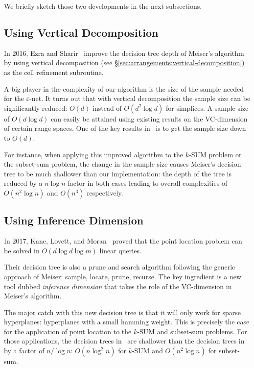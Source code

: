 We briefly sketch those two developments in the next subsections.

\subsection{Using Vertical Decomposition}%
\label{sec:developments:ksum-algorithm:ES17}

In 2016, Ezra and Sharir~\cite{ES17} improve the decision tree depth of
Meiser's algorithm by using vertical decomposition (see \S\ref{sec:arrangements:vertical-decomposition}) as the cell refinement
subroutine.

A big player in the complexity of our algorithm is the size of the sample
needed for the \(\varepsilon\)-net. It turns out that with
vertical decomposition the sample size can be significantly reduced: $O(d)$
instead of $O(d^2 \log d)$ for simplices.
%
A sample size of $O(d \log d)$ can easily be attained using existing results on
the VC-dimension of certain range spaces. One of the key results in~\cite{ES17}
is to get the sample size down to $O(d)$.

For instance,
when applying this improved algorithm to the \(k\)-SUM problem or the
subset-sum problem,
the change in the sample size causes Meiser's decision tree to be
much shallower than our implementation:
the depth of the tree is reduced by a \(n \log n\) factor in both cases leading
to overall complexities of \(O(n^2 \log n)\) and \(O(n^3)\) respectively.

\subsection{Using Inference Dimension}%
\label{sec:developments:ksum-algorithm:KLM18}

In 2017, Kane, Lovett, and Moran~\cite{KLM18} proved that the point location
problem can be solved in \(O(d \log d \log m)\) linear queries.

Their decision tree is also a prune and search algorithm following
the generic approach of Meiser: sample, locate,
prune, recurse. The key ingredient is a new tool dubbed \emph{inference
dimension} that takes the role of the VC-dimension in Meiser's algorithm.

The major catch with this new decision tree is that it will only work for
sparse hyperplanes: hyperplanes with a small hamming weight. This is precisely
the case for the application of point location to the \(k\)-SUM and subset-sum
problems. For those applications, the decision trees in~\cite{KLM18} are shallower than the
decision trees in~\cite{ES17} by a factor of $n / \log n$:
$O(n \log^2 n)$ for \(k\)-SUM and \(O(n^2 \log n)\) for subset-sum.

